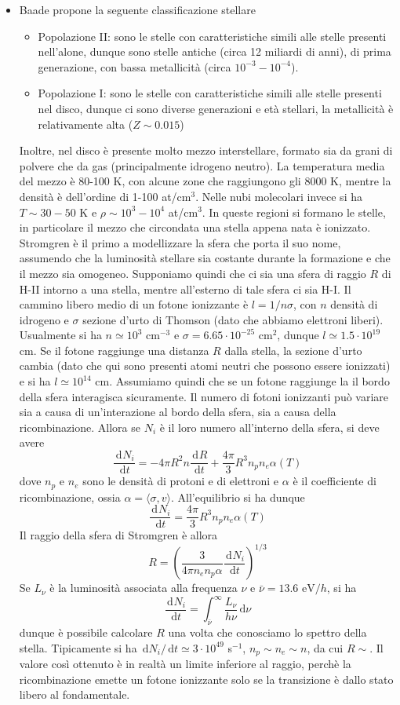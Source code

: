 \documentclass[a4paper,11pt]{article}
\renewcommand{\d}{\mathrm{d}} %
\newcommand{\der}[3][]{\frac{\d ^{#1}#2}{\d {#3}^{#1}}} %
\renewcommand{\d}{\,\mathrm{d}}
\theoremstyle{theorem}
\theoremstyle{definition}
\begin{document}
\begin{itemize}
		\item Baade propone la seguente classificazione stellare
		\begin{itemize}
			\item Popolazione II: sono le stelle con caratteristiche simili alle stelle presenti nell'alone, dunque sono stelle antiche (circa 12 miliardi di anni), di prima generazione, con bassa metallicità (circa $10^{-3}-10^{-4}$).
			\item Popolazione I: sono le stelle con caratteristiche simili alle stelle presenti nel disco, dunque ci sono diverse generazioni e età stellari, la metallicità è relativamente alta ($Z\sim0.015$)
		\end{itemize}
		Inoltre, nel disco è presente molto mezzo interstellare, formato sia da grani di polvere che da gas (principalmente idrogeno neutro). La temperatura media del mezzo è 80-100 K, con alcune zone che raggiungono gli 8000 K, mentre la densità è dell'ordine di 1-100 at/cm$^3$. Nelle nubi molecolari invece si ha $T\sim 30-50$ K e $\rho\sim 10^3-10^4$ at/cm$^3$. In queste regioni si formano le stelle, in particolare il mezzo che circondata una stella appena nata è ionizzato. Stromgren è il primo a modellizzare la sfera che porta il suo nome, assumendo che la luminosità stellare sia costante durante la formazione e che il mezzo sia omogeneo. Supponiamo quindi che ci sia una sfera di raggio $R$ di H-II intorno a una stella, mentre all'esterno di tale sfera ci sia H-I. Il cammino libero medio di un fotone ionizzante è $l=1/n\sigma$, con $n$ densità di idrogeno e $\sigma$ sezione d'urto di Thomson (dato che abbiamo elettroni liberi). Usualmente si ha $n\simeq 10^3$ cm$^{-3}$ e $\sigma=6.65\cdot10^{-25}$ cm$^2$, dunque $l\simeq1.5\cdot10^{19}$ cm. Se il fotone raggiunge una distanza $R$ dalla stella, la sezione d'urto cambia (dato che qui sono presenti atomi neutri che possono essere ionizzati) e si ha $l\simeq10^{14}$ cm. Assumiamo quindi che se un fotone raggiunge la il bordo della sfera interagisca sicuramente. Il numero di fotoni ionizzanti può variare sia a causa di un'interazione al bordo della sfera, sia a causa della ricombinazione. Allora se $N_i$ è il loro numero all'interno della sfera, si deve avere
		\[\der{N_i}{t}=-4\pi R^2n\der{R}{t}+\frac{4\pi}{3}R^3 n_pn_e\alpha(T)\]
		dove $n_p$ e $n_e$ sono le densità di protoni e di elettroni e $\alpha$ è il coefficiente di ricombinazione, ossia $\alpha=\langle\sigma,v\rangle$. All'equilibrio si ha dunque
		\[\der{N_i}{t}=\frac{4\pi}{3}R^3n_pn_e\alpha(T)\]
		Il raggio della sfera di Stromgren è allora
		\[R=\left(\frac{3}{4\pi n_en_p\alpha}\der{N_i}{t}\right)^{1/3}\]
		Se $L_\nu$ è la luminosità associata alla frequenza $\nu$ e $\bar\nu=13.6\textrm{ eV}/h$, si ha
		\[\der{N_i}{t}=\int_{\bar\nu}^{\infty}\frac{L_\nu}{h\nu}\d\nu\]
		dunque è possibile calcolare $R$ una volta che conosciamo lo spettro della stella. Tipicamente si ha $\d N_i/\d t\simeq3\cdot10^{49}$ s$^{-1}$, $n_p\sim n_e\sim n$, da cui $R\sim$. Il valore così ottenuto è in realtà un limite inferiore al raggio, perchè la ricombinazione emette un fotone ionizzante solo se la transizione è dallo stato libero al fondamentale.
	\end{itemize}
\end{document}

